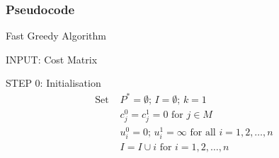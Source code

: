 \documentclass[11pt]{article}
\begin{document}
	\subsubsection{Pseudocode}
	\begin{algorithm}
		\caption{Fast Greedy Algorithm}
		\begin{algorithmic}[0]
			
			\Statex 
			\Statex INPUT: Cost Matrix
						
			\Statex
			\Statex STEP 0: Initialisation 	
			\begin{align*}
			\text{Set } & P^{*} = \emptyset \text{; } I = \emptyset \text{; } k = 1\\
			& c_j^0=c_j^1 = 0 \text{ for }j\in M\\
			& u_i^0 = 0 \text{; } u_i^1 = \infty\text{ for all } i=1,2,\dots,n\\
			& I=I\cup i \text{ for } i=1,2,\dots,n
			\end{align*}
\Statex	
{}
\end{algorithmic}
\end{algorithm}
\end{document}
